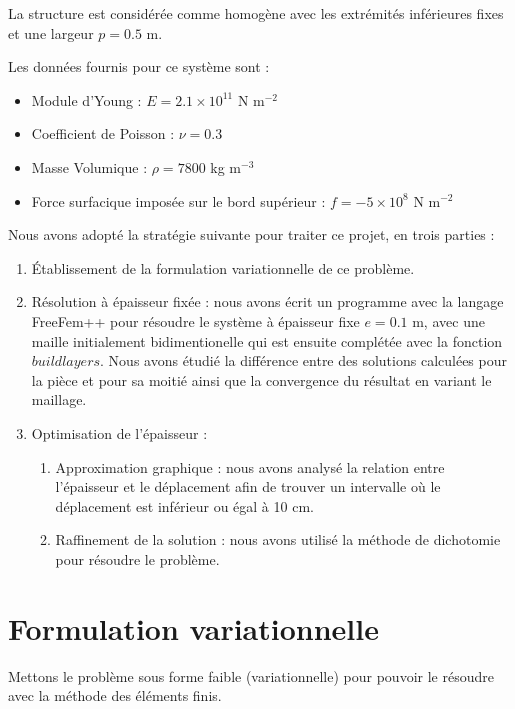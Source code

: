 \documentclass{article}
\begin{document}
    La structure est considérée comme homogène avec les extrémités inférieures fixes et une largeur $p = 0.5$ m. 
    
    Les données fournis pour ce système sont :
    
    \begin{itemize}
    \item Module d'Young : $E = 2.1 \times 10^11$ N m$^{-2}$
    \item Coefficient de Poisson : $\nu = 0.3$ 
    \item Masse Volumique : $\rho = 7800$ kg m$^{-3}$
    \item Force surfacique imposée sur le bord supérieur : $f= - 5 \times 10^8$ N m$^{-2}$
    \end{itemize}
    
    Nous avons adopté la stratégie suivante pour traiter ce projet, en trois parties :
    \begin{enumerate}
        \item Établissement de la formulation variationnelle de ce problème.
        \item Résolution à épaisseur fixée : nous avons écrit un programme avec la langage FreeFem++ pour résoudre le système à épaisseur fixe $e = 0.1$ m, 
            avec une maille initialement bidimentionelle qui est ensuite complétée avec la fonction $buildlayers$. 
            Nous avons étudié la différence entre des solutions calculées pour la pièce et pour sa moitié ainsi que la convergence du résultat en variant le maillage.
        \item Optimisation de l'épaisseur :
        \begin{enumerate}
            \item Approximation graphique : 
                nous avons analysé la relation entre l'épaisseur et le déplacement afin de trouver un intervalle où le déplacement est inférieur ou égal à 10 cm.
            \item Raffinement de la solution : nous avons utilisé la méthode de dichotomie pour résoudre le problème.
        \end{enumerate}
    \end{enumerate}

    \newpage
    
    \section{Formulation variationnelle}

    \begin{problem}{1}
    Mettons le problème sous forme faible (variationnelle) pour pouvoir le résoudre avec la méthode des éléments finis.
    \end{problem}
      
\end{document}
